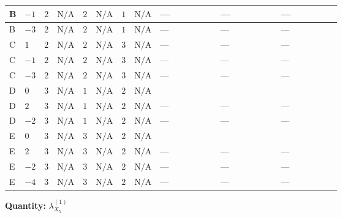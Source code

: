 \documentclass[8pt]{article}
\begin{document}
\begin{landscape}
\begin{longtable}{@{}llcccccc >{\raggedright\arraybackslash}p{0.21\linewidth} >{\raggedright\arraybackslash}p{0.21\linewidth} >{\raggedright\arraybackslash}p{0.21\linewidth}@{}}
\midrule
B & $-1$ & $2$ & $\text{N/A}$ & $2$ & $\text{N/A}$ & $1$ & $\text{N/A}$ & --- & --- & --- \\
\midrule
B & $-3$ & $2$ & $\text{N/A}$ & $2$ & $\text{N/A}$ & $1$ & $\text{N/A}$ & --- & --- & --- \\
\midrule
C & $1$ & $2$ & $\text{N/A}$ & $2$ & $\text{N/A}$ & $3$ & $\text{N/A}$ & --- & --- & --- \\
\midrule
C & $-1$ & $2$ & $\text{N/A}$ & $2$ & $\text{N/A}$ & $3$ & $\text{N/A}$ & --- & --- & --- \\
\midrule
C & $-3$ & $2$ & $\text{N/A}$ & $2$ & $\text{N/A}$ & $3$ & $\text{N/A}$ & --- & --- & --- \\
\midrule
D & $0$ & $3$ & $\text{N/A}$ & $1$ & $\text{N/A}$ & $2$ & $\text{N/A}$ & \scriptsize\adjustbox{max width=\linewidth}{$\begin{gathered} -6 {g_1}^2 {\lambda_{X_{5}}^{(1)}}\end{gathered}$} & \scriptsize\adjustbox{max width=\linewidth}{$\begin{gathered} +{\lambda_{12}^{(1)}} (8 {\lambda_{X_{5}}^{(1)}}+10 {\lambda_{X_{9}}})\end{gathered}$} & \scriptsize\adjustbox{max width=\linewidth}{$\begin{gathered} +4 {\lambda_{HS_2}^{(1)}} {\lambda_{X_{18}}}\end{gathered}$} \\
\midrule
D & $2$ & $3$ & $\text{N/A}$ & $1$ & $\text{N/A}$ & $2$ & $\text{N/A}$ & --- & --- & --- \\
\midrule
D & $-2$ & $3$ & $\text{N/A}$ & $1$ & $\text{N/A}$ & $2$ & $\text{N/A}$ & --- & --- & --- \\
\midrule
E & $0$ & $3$ & $\text{N/A}$ & $3$ & $\text{N/A}$ & $2$ & $\text{N/A}$ & \scriptsize\adjustbox{max width=\linewidth}{$\begin{gathered} -6 {g_1}^2 {\lambda_{X_{5}}^{(1)}}\end{gathered}$} & \scriptsize\adjustbox{max width=\linewidth}{$\begin{gathered} +{\lambda_{12}^{(1)}} (8 {\lambda_{X_{5}}^{(1)}}+10 {\lambda_{X_{9}}})\end{gathered}$} & \scriptsize\adjustbox{max width=\linewidth}{$\begin{gathered} +4 {\lambda_{HS_2}^{(1)}} {\lambda_{X_{18}}}\end{gathered}$} \\
\midrule
E & $2$ & $3$ & $\text{N/A}$ & $3$ & $\text{N/A}$ & $2$ & $\text{N/A}$ & --- & --- & --- \\
\midrule
E & $-2$ & $3$ & $\text{N/A}$ & $3$ & $\text{N/A}$ & $2$ & $\text{N/A}$ & --- & --- & --- \\
\midrule
E & $-4$ & $3$ & $\text{N/A}$ & $3$ & $\text{N/A}$ & $2$ & $\text{N/A}$ & --- & --- & --- \\
\midrule
\bottomrule
\end{longtable}
\clearpage
\noindent\textbf{Quantity: }${\lambda_{X_{5}}^{(1)}}$\par\smallskip

\end{landscape}
\end{document}
